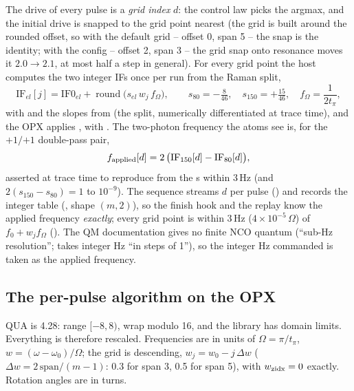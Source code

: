 The drive of every pulse is a \emph{grid index} $d$: the control law picks the
argmax, and the initial drive is snapped to the grid point nearest
 (the grid is built around the
rounded offset, so with the default grid -- offset 0, span 5 -- the snap is
the identity; with the  config -- offset 2, span 3 --
the grid snap onto resonance moves it $2.0 \to 2.1$, at most half a step in
general). For every grid point the host computes the two integer IFs once per
run from the Raman split,
\[
  \mathrm{IF}_{el}[j] = \mathrm{IF0}_{el} + \operatorname{round}\big(s_{el}\, w_j\, f_\Omega\big),\qquad
  s_{80} = -\tfrac{8}{46},\quad s_{150} = +\tfrac{15}{46},\quad f_\Omega = \frac{1}{2t_\pi},
\]
with  and the slopes from 
(the  split, numerically differentiated at trace time), and
the OPX applies ,  with
. The two-photon frequency the atoms see
is, for the $+1/{+1}$ double-pass pair,
\[
  f_{\rm applied}[d] = 2\,\big(\mathrm{IF}_{150}[d] - \mathrm{IF}_{80}[d]\big),
\]
asserted at trace time to reproduce  from
the s within 3\,Hz (and $2(s_{150} - s_{80}) = 1$ to $10^{-9}$). The
sequence streams $d$ per pulse () and records the integer
table (, shape $(m, 2)$), so the finish hook and the replay
know the applied frequency \emph{exactly}; every grid point is within 3\,Hz
($4\times 10^{-5}\,\Omega$) of $f_0 + w_j f_\Omega$
(). The QM
documentation gives no finite NCO quantum (``sub-Hz resolution'';
 takes integer Hz ``in steps of 1''), so the integer
Hz commanded is taken as the applied frequency.

\subsection{The per-pulse algorithm on the OPX}
\label{sec:feedback:numerics}

QUA  is 4.28: range $[-8, 8)$, wrap modulo 16, and the
 library has domain limits. Everything is therefore rescaled.
Frequencies are in units of $\Omega = \pi/t_\pi$, $w = (\omega - \omega_0)/\Omega$;
the grid is descending, $w_j = w_0 - j\,\Delta w$ ($\Delta w = 2\,\mathrm{span}/(m-1)$:
0.3 for span 3, 0.5 for span 5), with $w_{\rm zidx} = 0$ exactly. Rotation
angles are in turns.

